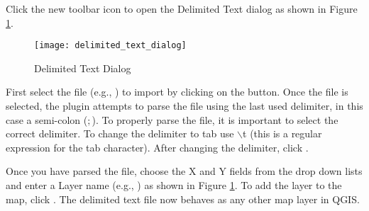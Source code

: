 Click the new toolbar icon  to open the Delimited Text dialog as shown in Figure \ref{fig:delim_text_plugin_dialog}.

\begin{figure}[ht]
   \centering
   \caption{Delimited Text Dialog \nixcaption}\label{fig:delim_text_plugin_dialog}\smallskip
   \texttt{[image: delimited\_text\_dialog]}
\end{figure}

First select the file (e.g., ) to import by clicking 
on the  button. Once the file is selected, the plugin attempts to parse the file 
using the last used delimiter, in this case a semi-colon (\mbox{$;$}). To properly parse the file, it 
is important to select the correct delimiter. To change the delimiter to tab use 
\mbox{$\backslash$}t (this is a regular expression for the tab character).
After changing the delimiter, click .

Once you have parsed the file, choose the X and Y fields from the drop down lists and 
enter a Layer name (e.g.,  ) as shown in Figure 
\ref{fig:delim_text_plugin_dialog}. To add the layer to the map, click 
. The delimited text file now behaves as any other map layer in QGIS.
